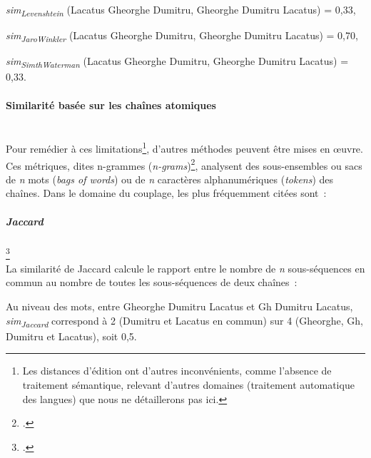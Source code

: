 \documentclass[a4paper,12pt,twoside]{book}
\begin{document}
                \textit{sim\textsubscript{Levenshtein}} (Lacatus Gheorghe Dumitru, Gheorghe Dumitru Lacatus) = 0,33,
                \vspace{0.2cm}
                
                \textit{sim\textsubscript{JaroWinkler}} (Lacatus Gheorghe Dumitru, Gheorghe Dumitru Lacatus) = 0,70,
                \vspace{0.2cm}
                
                \textit{sim\textsubscript{SimthWaterman}} (Lacatus Gheorghe Dumitru, Gheorghe Dumitru Lacatus) = 0,33.
                
                
                \paragraph{Similarité basée sur les chaînes atomiques}\mbox{}\\
                \label{ngram}
                Pour remédier à ces limitations\footnote{Les distances d'édition ont d'autres inconvénients, comme l'absence de traitement sémantique, relevant d'autres domaines (traitement automatique des langues) que nous ne détaillerons pas ici.}, d'autres méthodes peuvent être mises en œuvre. Ces métriques, dites \og{}n-grammes\fg{} (\textit{n-grams})\footcite{Ngram2022}, analysent des sous-ensembles ou \og{}sacs\fg{} de \textit{n} mots (\textit{bags of words}) ou de \textit{n} caractères alphanumériques (\textit{tokens}) des chaînes. Dans le domaine du couplage, les plus fréquemment citées sont~:
                
                \subparagraph{Jaccard}\footcite{IndiceDistanceJaccard2021} \\
                
                La similarité de Jaccard calcule le rapport entre le nombre de \textit{n} sous-séquences en commun au nombre de toutes les sous-séquences de deux chaînes~:
                
                Au niveau des mots, entre \og{}Gheorghe Dumitru Lacatus\fg{} et \og{}Gh Dumitru Lacatus\fg{}, \textit{sim\textsubscript{Jaccard}} correspond à 2 (Dumitru et Lacatus en commun) sur 4 (Gheorghe, Gh, Dumitru et Lacatus), soit 0,5.
                
\end{document}
